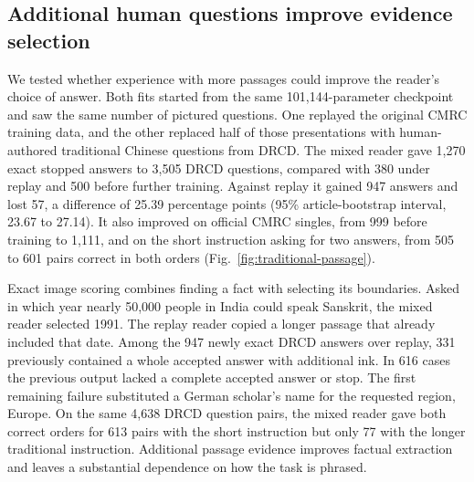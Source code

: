 \subsection*{Additional human questions improve evidence selection}
We tested whether experience with more passages could improve the reader's choice of answer. Both fits started from the same 101,144-parameter checkpoint and saw the same number of pictured questions. One replayed the original CMRC training data, and the other replaced half of those presentations with human-authored traditional Chinese questions from DRCD. The mixed reader gave 1,270 exact stopped answers to 3,505 DRCD questions, compared with 380 under replay and 500 before further training. Against replay it gained 947 answers and lost 57, a difference of 25.39 percentage points (95\% article-bootstrap interval, 23.67 to 27.14). It also improved on official CMRC singles, from 999 before training to 1,111, and on the short instruction asking for two answers, from 505 to 601 pairs correct in both orders (Fig.~\ref{fig:traditional-passage}).

Exact image scoring combines finding a fact with selecting its boundaries. Asked in which year nearly 50,000 people in India could speak Sanskrit, the mixed reader selected 1991. The replay reader copied a longer passage that already included that date. Among the 947 newly exact DRCD answers over replay, 331 previously contained a whole accepted answer with additional ink. In 616 cases the previous output lacked a complete accepted answer or stop. The first remaining failure substituted a German scholar's name for the requested region, Europe. On the same 4,638 DRCD question pairs, the mixed reader gave both correct orders for 613 pairs with the short instruction but only 77 with the longer traditional instruction. Additional passage evidence improves factual extraction and leaves a substantial dependence on how the task is phrased.
